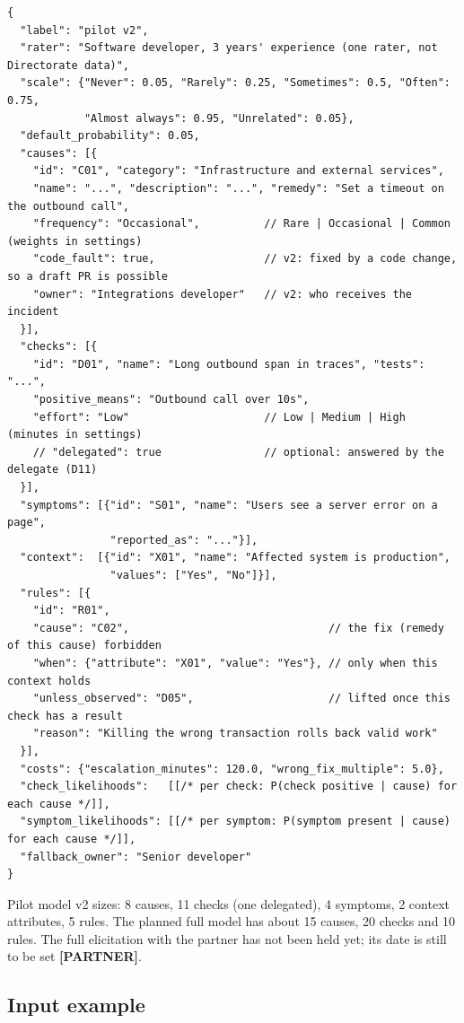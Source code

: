 \documentclass[11pt,a4paper]{article}
\newcommand{\partner}{\textbf{[PARTNER]}}
\newenvironment{codeblock}{\par\footnotesize}{\par}
\begin{document}
\begin{codeblock}
\begin{verbatim}
{
  "label": "pilot v2",
  "rater": "Software developer, 3 years' experience (one rater, not Directorate data)",
  "scale": {"Never": 0.05, "Rarely": 0.25, "Sometimes": 0.5, "Often": 0.75,
            "Almost always": 0.95, "Unrelated": 0.05},
  "default_probability": 0.05,
  "causes": [{
    "id": "C01", "category": "Infrastructure and external services",
    "name": "...", "description": "...", "remedy": "Set a timeout on the outbound call",
    "frequency": "Occasional",          // Rare | Occasional | Common (weights in settings)
    "code_fault": true,                 // v2: fixed by a code change, so a draft PR is possible
    "owner": "Integrations developer"   // v2: who receives the incident
  }],
  "checks": [{
    "id": "D01", "name": "Long outbound span in traces", "tests": "...",
    "positive_means": "Outbound call over 10s",
    "effort": "Low"                     // Low | Medium | High (minutes in settings)
    // "delegated": true                // optional: answered by the delegate (D11)
  }],
  "symptoms": [{"id": "S01", "name": "Users see a server error on a page",
                "reported_as": "..."}],
  "context":  [{"id": "X01", "name": "Affected system is production",
                "values": ["Yes", "No"]}],
  "rules": [{
    "id": "R01",
    "cause": "C02",                               // the fix (remedy of this cause) forbidden
    "when": {"attribute": "X01", "value": "Yes"}, // only when this context holds
    "unless_observed": "D05",                     // lifted once this check has a result
    "reason": "Killing the wrong transaction rolls back valid work"
  }],
  "costs": {"escalation_minutes": 120.0, "wrong_fix_multiple": 5.0},
  "check_likelihoods":   [[/* per check: P(check positive | cause) for each cause */]],
  "symptom_likelihoods": [[/* per symptom: P(symptom present | cause) for each cause */]],
  "fallback_owner": "Senior developer"
}
\end{verbatim}
\end{codeblock}

Pilot model v2 sizes: 8 causes, 11 checks (one delegated), 4 symptoms, 2 context attributes,
5 rules. The planned full model has about 15 causes, 20 checks and 10 rules.
The full elicitation with the partner has not been held yet; its date is still to be set \partner.

\subsection{Input example}
\end{document}
